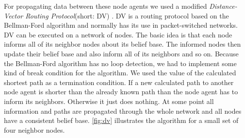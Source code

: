 For propagating data between these node agents we used a modified \emph{Distance-Vector Routing Protocol}(short: DV) \cite{wiki:dvrp}. DV is a routing protocol based on the Bellman-Ford algorithm \cite{wiki:bellman_ford} and normally has its use in packet-switched networks. DV can be executed on a network of nodes. The basic idea is that each node informs all of its neighbor nodes about its belief base. The informed nodes then update their belief base and also inform all of its neighbors and so on. Because the Bellman-Ford algorithm has no loop detection, we had to implement some kind of break condition for the algorithm. We used the value of the calculated shortest path as a termination condition. If a new calculated path to another node agent is shorter than the already known path than the node agent has to inform its neighbors. Otherwise it just does nothing. At some point all information and paths are propagated through the whole network and all nodes have a consistent belief base. \autoref{fig:dv} illustrates the algorithm for a small set of four neighbor nodes.


